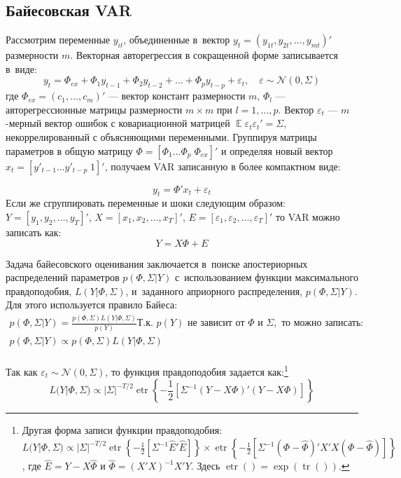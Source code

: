 \documentclass[11pt]{article} %
\DeclareMathOperator{\etr}{etr}
\DeclareMathOperator{\tr}{tr}
\DeclareMathOperator{\E}{\mathbb{E}}
\newcommand{\cN}{\mathcal{N}}
\begin{document}
\subsection{Байесовская VAR}
Рассмотрим переменные $y_{it}$, объединенные в~вектор  $y_{t}=(y_{1t},y_{2t},\ldots, y_{mt})'$ размерности $m$. Векторная авторегрессия в сокращенной форме записывается в~виде:
\begin{equation}
y_t =\Phi_{ex}+ \Phi_1 y_{t-1} + \Phi_2 y_{t-2} +\ldots + \Phi_p y_{t-p} + \varepsilon_t,\quad \varepsilon\sim \cN(0,\Sigma)
\end{equation}
где $\Phi_{ex}=(c_1,\ldots ,c_m)'$ --- вектор констант размерности $m$, $\Phi_l$ --– авторегрессионные матрицы размерности $m\times m$ при $l=1, \ldots, p$. Вектор $\varepsilon_t$ --- $m$-мерный вектор ошибок с ковариационной матрицей $\E\varepsilon_t \varepsilon _t'=\Sigma$, некоррелированный с объясняющими переменными.
Группируя матрицы параметров в общую матрицу $\Phi=[\Phi_1 \ldots \Phi_p \; \Phi_{ex}]'$ %
и определяя новый вектор $x_t=[ y'_{t-1} \ldots  y'_{t-p} \; 1]'$, получаем VAR записанную в более компактном виде:

\begin{equation}
y_t=\Phi' x_t+\varepsilon_t
\end{equation}
Если же сгруппировать переменные  и шоки следующим образом: $Y=[y_1, y_2,\ldots, y_T]'$, $X=[x_1, x_2,\ldots, x_T]'$, $E=[\varepsilon_1, \varepsilon_2,\ldots, \varepsilon_T]'$ то VAR можно записать как:
\begin{equation}
Y=X\Phi+E\label{var}
\end{equation}

Задача байесовского оценивания заключается в~поиске апостериорных распределений параметров $p(\Phi, \Sigma|Y)$ с~использованием функции максимального правдоподобия, $L(Y|\Phi, \Sigma)$, и~заданного априорного распределения, $p(\Phi, \Sigma|Y)$. Для этого используется правило Байеса:
\begin{gather}
p(\Phi, \Sigma|Y)=\frac{p(\Phi,\Sigma) L(Y|\Phi,\Sigma)}{p(Y)}
\text{Т.к. }p(Y) \text{ не зависит от } \Phi \text{ и }\Sigma, \text{ то можно записать: }\\
p(\Phi, \Sigma|Y)\propto p(\Phi,\Sigma) L(Y|\Phi,\Sigma)
\end{gather}\\
Так как $\varepsilon_t\sim \cN(0,\Sigma)$, то функция правдоподобия задается как:\footnote{ Другая форма записи функции правдоподобия: $L(Y|\Phi, \Sigma) \propto |\Sigma|^{-T/2}\etr\left\lbrace -\frac{1}{2}  \left[\Sigma^{-1} \hat E' \hat E\right]\right\rbrace \times \etr\left\lbrace -\frac{1}{2}  \left[\Sigma^{-1}(\Phi-\hat\Phi)'X'X(\Phi-\hat\Phi)\right]\right\rbrace$, где $\hat E=Y-X\hat\Phi$ и $\hat \Phi=(X'X)^{-1}X'Y$. Здесь $\etr()=\exp(\tr())$. }
\begin{equation}
L(Y|\Phi, \Sigma) \propto |\Sigma|^{-T/2}\etr\left\lbrace -\frac{1}{2}  \left[\Sigma^{-1}(Y-X\Phi)'(Y-X\Phi)\right]\right\rbrace\label{likelihood}
\end{equation}
\end{document}

